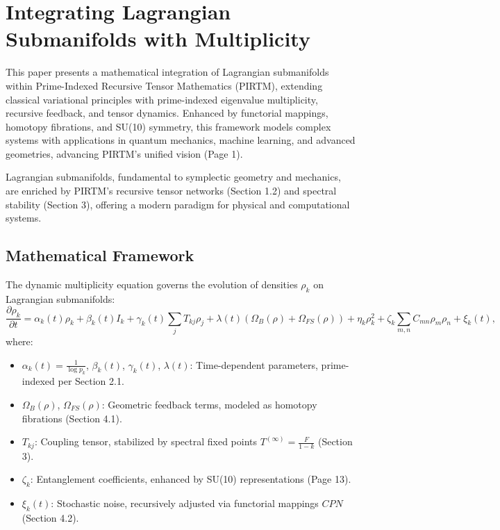 \documentclass{article}
\theoremstyle{plain}
\begin{document}
\section{Integrating Lagrangian Submanifolds with Multiplicity}

This paper presents a mathematical integration of Lagrangian submanifolds within Prime-Indexed Recursive Tensor Mathematics (PIRTM), extending classical variational principles with prime-indexed eigenvalue multiplicity, recursive feedback, and tensor dynamics. Enhanced by functorial mappings, homotopy fibrations, and SU(10) symmetry, this framework models complex systems with applications in quantum mechanics, machine learning, and advanced geometries, advancing PIRTM’s unified vision (Page 1).

Lagrangian submanifolds, fundamental to symplectic geometry and mechanics, are enriched by PIRTM’s recursive tensor networks (Section 1.2) and spectral stability (Section 3), offering a modern paradigm for physical and computational systems.

\subsection{Mathematical Framework}
The dynamic multiplicity equation governs the evolution of densities \( \rho_k \) on Lagrangian submanifolds:
\begin{equation}
\frac{\partial \rho_k}{\partial t} = \alpha_k(t) \rho_k + \beta_k(t) I_k + \gamma_k(t) \sum_{j} T_{kj} \rho_j + \lambda(t) (\Omega_B(\rho) + \Omega_{FS}(\rho)) + \eta_k \rho_k^2 + \zeta_k \sum_{m,n} C_{mn} \rho_m \rho_n + \xi_k(t),
\label{eq:dynamic_multiplicity}
\end{equation}
where:
\begin{itemize}
    \item \( \alpha_k(t) = \frac{1}{\log p_k} \), \( \beta_k(t) \), \( \gamma_k(t) \), \( \lambda(t) \): Time-dependent parameters, prime-indexed per Section 2.1.
    \item \( \Omega_B(\rho) \), \( \Omega_{FS}(\rho) \): Geometric feedback terms, modeled as homotopy fibrations (Section 4.1).
    \item \( T_{kj} \): Coupling tensor, stabilized by spectral fixed points \( T^{(\infty)} = \frac{F}{1 - k} \) (Section 3).
    \item \( \zeta_k \): Entanglement coefficients, enhanced by SU(10) representations (Page 13).
    \item \( \xi_k(t) \): Stochastic noise, recursively adjusted via functorial mappings \( CPN \) (Section 4.2).
\end{itemize}
\end{document}
